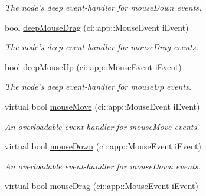 \begin{DoxyCompactItemize}
\begin{DoxyCompactList}\small\item\em The node's deep event-\/handler for mouse\-Down events. \end{DoxyCompactList}\item 
\hypertarget{class_gui_base_a9c08b19d2015b258344e5beb250166b9}{bool \hyperlink{class_gui_base_a9c08b19d2015b258344e5beb250166b9}{deep\-Mouse\-Drag} (ci\-::app\-::\-Mouse\-Event i\-Event)}\label{class_gui_base_a9c08b19d2015b258344e5beb250166b9}

\begin{DoxyCompactList}\small\item\em The node's deep event-\/handler for mouse\-Drag events. \end{DoxyCompactList}\item 
\hypertarget{class_gui_base_a5c32547724d1bb464a5de324be6d952e}{bool \hyperlink{class_gui_base_a5c32547724d1bb464a5de324be6d952e}{deep\-Mouse\-Up} (ci\-::app\-::\-Mouse\-Event i\-Event)}\label{class_gui_base_a5c32547724d1bb464a5de324be6d952e}

\begin{DoxyCompactList}\small\item\em The node's deep event-\/handler for mouse\-Up events. \end{DoxyCompactList}\item 
\hypertarget{class_gui_base_aa7dc9f856dcdad3957fccdb3ffed73a1}{virtual bool \hyperlink{class_gui_base_aa7dc9f856dcdad3957fccdb3ffed73a1}{mouse\-Move} (ci\-::app\-::\-Mouse\-Event i\-Event)}\label{class_gui_base_aa7dc9f856dcdad3957fccdb3ffed73a1}

\begin{DoxyCompactList}\small\item\em An overloadable event-\/handler for mouse\-Move events. \end{DoxyCompactList}\item 
\hypertarget{class_gui_base_ab8dad5df129e93169feef4a5ff6fa01c}{virtual bool \hyperlink{class_gui_base_ab8dad5df129e93169feef4a5ff6fa01c}{mouse\-Down} (ci\-::app\-::\-Mouse\-Event i\-Event)}\label{class_gui_base_ab8dad5df129e93169feef4a5ff6fa01c}

\begin{DoxyCompactList}\small\item\em An overloadable event-\/handler for mouse\-Down events. \end{DoxyCompactList}\item 
\hypertarget{class_gui_base_aabaebece81c1da9dd999facbaf4069f7}{virtual bool \hyperlink{class_gui_base_aabaebece81c1da9dd999facbaf4069f7}{mouse\-Drag} (ci\-::app\-::\-Mouse\-Event i\-Event)}\label{class_gui_base_aabaebece81c1da9dd999facbaf4069f7}


\end{DoxyCompactItemize}
